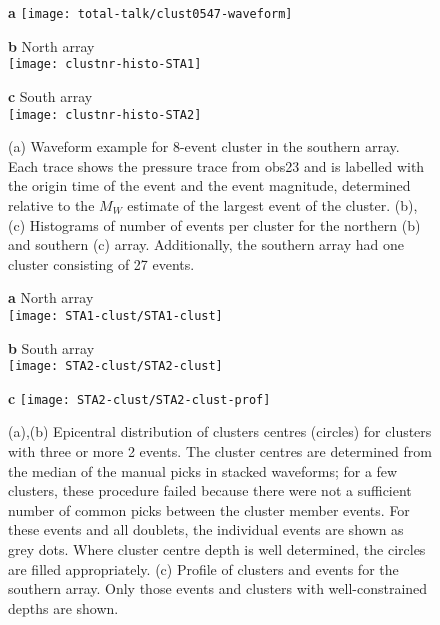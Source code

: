 \documentclass[reviewcopy]{elsarticle}
\renewcommand{\includegraphics}[2][]{\fbox{#2}}
\begin{document}
\begin{figure}
{\sf \bf a}
\texttt{[image: total-talk/clust0547-waveform]}\\[1cm]

\parbox{0.5\textwidth}{{\sf \bf b} North array \\
\texttt{[image: clustnr-histo-STA1]}}
\parbox{0.5\textwidth}{{\sf \bf c} South array \\
\texttt{[image: clustnr-histo-STA2]}}


\caption{(a) Waveform example for 8-event cluster in the southern
  array.  Each trace shows the pressure trace from obs23 and is labelled with the origin time of the event and
  the event magnitude, determined relative to the $M_W$ estimate of
  the largest event of the
cluster. (b), (c) Histograms of number of events per cluster for the northern
(b) and southern (c) array. Additionally, the southern array had one
cluster consisting of 27 events.}
\label{fig:clust-waveform-histo}
\end{figure}

\begin{figure}
\parbox{0.5\textwidth}{{\sf \bf a} North array \\
\texttt{[image: STA1-clust/STA1-clust]}}
\parbox{0.5\textwidth}{{\sf \bf b} South array \\
\texttt{[image: STA2-clust/STA2-clust]}}
{\sf \bf c}
\texttt{[image: STA2-clust/STA2-clust-prof]}

\caption{(a),(b) Epicentral distribution of clusters centres
  (circles) for clusters with three or more 2 events. The cluster centres
  are determined from the median of the manual picks in stacked
  waveforms; for a few clusters, these procedure failed because there
  were not a sufficient number of common picks between the cluster
  member events.   For these events and all doublets, the
  individual events are shown as grey dots.  Where cluster centre
  depth is well determined, the circles are filled appropriately.
 (c) Profile of clusters and events for the southern array. Only those events and
 clusters with well-constrained depths are shown.}
\label{fig:clust-location}
\end{figure}
\end{document}
